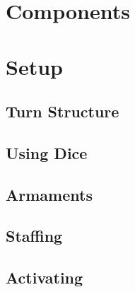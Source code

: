 \documentclass[12pt,a4paper,twocolumn,titlepage]{article}
\begin{document}
\begin{titlepage}
  
\end{titlepage}



\section{Components}
\label{sec:components}


\section{Setup}
\label{sec:setup}

% 

\subsection{Turn Structure}
\label{sec:turns}


\subsection{Using Dice}
\label{sec:dice}

% 

\subsection{Armaments}
\label{sec:armaments}

% 

% 

\subsection{Staffing}
\label{sec:components}


\subsection{Activating}
\label{sec:components}

\end{document}
